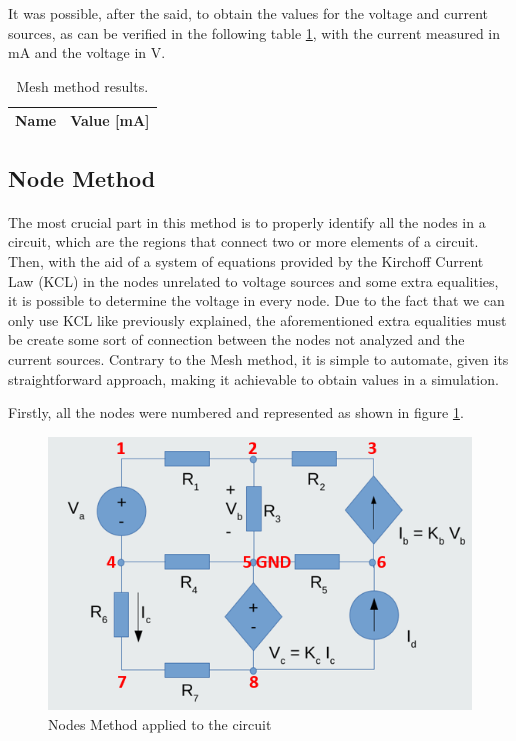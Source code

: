 \par It was possible, after the said, to obtain the values for the voltage and current sources, as can be verified in the following table \ref{mesh}, with the current measured in mA and the voltage in V. 

\begin{table}[H]
  \centering
  \begin{tabular}{|c|c|}
    \hline    
    {\bf Name} & {\bf Value [mA]} \\ \hline
    
  \end{tabular}
  \caption{Mesh method results.}
  \label{mesh}
\end{table}
\newpage
\subsection{Node Method}
\paragraph{}
\par The most crucial part in this method is to properly identify all the nodes in a circuit, which are the regions that connect two or more elements of a circuit. Then, with the aid of a system of equations provided by the Kirchoff Current Law (KCL) in the nodes unrelated to voltage sources and some extra equalities, it is possible to determine the voltage in every node. Due to the fact that we can only use KCL like previously explained, the aforementioned extra equalities must be create some sort of connection between the nodes not analyzed and the current sources. Contrary to the Mesh method, it is simple to automate, given its straightforward approach, making it achievable to obtain values in a simulation.


\par Firstly, all the nodes were numbered and represented as shown in figure \ref{circuitlt}.
 
\begin{figure}[H]
    \includegraphics[width=0.8\linewidth]{Nodes.png}
    \centering
    \caption{Nodes Method applied to the circuit}
    \label{circuitlt}
\end{figure}


